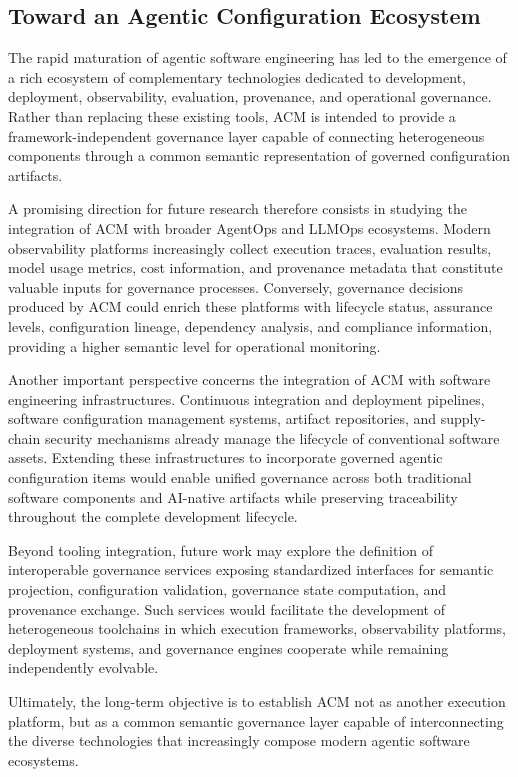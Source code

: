 \documentclass[10pt]{article}
\begin{document}
\subsection{Toward an Agentic Configuration Ecosystem}
\label{sec:future_ecosystem}

The rapid maturation of agentic software engineering has led to the emergence of a rich ecosystem of complementary technologies dedicated to development, deployment, observability, evaluation, provenance, and operational governance. Rather than replacing these existing tools, ACM is intended to provide a framework-independent governance layer capable of connecting heterogeneous components through a common semantic representation of governed configuration artifacts.

A promising direction for future research therefore consists in studying the integration of ACM with broader AgentOps and LLMOps ecosystems. Modern observability platforms increasingly collect execution traces, evaluation results, model usage metrics, cost information, and provenance metadata that constitute valuable inputs for governance processes. Conversely, governance decisions produced by ACM could enrich these platforms with lifecycle status, assurance levels, configuration lineage, dependency analysis, and compliance information, providing a higher semantic level for operational monitoring.

Another important perspective concerns the integration of ACM with software engineering infrastructures. Continuous integration and deployment pipelines, software configuration management systems, artifact repositories, and supply-chain security mechanisms already manage the lifecycle of conventional software assets. Extending these infrastructures to incorporate governed agentic configuration items would enable unified governance across both traditional software components and AI-native artifacts while preserving traceability throughout the complete development lifecycle.

Beyond tooling integration, future work may explore the definition of interoperable governance services exposing standardized interfaces for semantic projection, configuration validation, governance state computation, and provenance exchange. Such services would facilitate the development of heterogeneous toolchains in which execution frameworks, observability platforms, deployment systems, and governance engines cooperate while remaining independently evolvable.

Ultimately, the long-term objective is to establish ACM not as another execution platform, but as a common semantic governance layer capable of interconnecting the diverse technologies that increasingly compose modern agentic software ecosystems.
\end{document}
